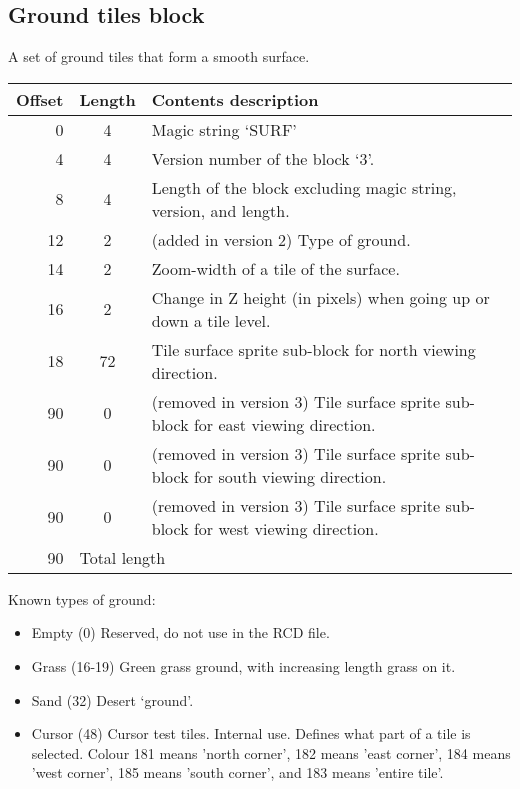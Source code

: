 \documentclass{article}
\begin{document}
\subsection{Ground tiles block}
A set of ground tiles that form a smooth surface.

\begin{center}
\begin{tabular}{|r|c|l|} \hline
\textbf{Offset} & \textbf{Length} & \textbf{Contents description} \\ \hline
   0 &  4 & Magic string `SURF' \\
   4 &  4 & Version number of the block `3'. \\
   8 &  4 & Length of the block excluding magic string, version, and length. \\
  12 &  2 & (added in version 2) Type of ground. \\
  14 &  2 & Zoom-width of a tile of the surface. \\
  16 &  2 & Change in Z height (in pixels) when going up or down a tile level. \\
  18 & 72 & Tile surface sprite sub-block for north viewing direction. \\
  90 &  0 & (removed in version 3) Tile surface sprite sub-block for east viewing direction. \\
  90 &  0 & (removed in version 3) Tile surface sprite sub-block for south viewing direction. \\
  90 &  0 & (removed in version 3) Tile surface sprite sub-block for west viewing direction. \\ \hline
  90 & \multicolumn{2}{l|}{Total length} \\ \hline
\end{tabular}
\end{center}

\medskip
\noindent
Known types of ground:
\begin{itemize}
\item Empty (0) Reserved, do not use in the RCD{} file.
\item Grass (16-19) Green grass ground, with increasing length grass on it.
\item Sand  (32) Desert `ground'.
\item Cursor (48) Cursor test tiles. Internal use. Defines what part of a tile
    is selected. Colour 181 means 'north corner', 182 means 'east corner', 184
    means 'west corner', 185 means 'south corner', and 183 means 'entire
    tile'.
\end{itemize}
\end{document}
